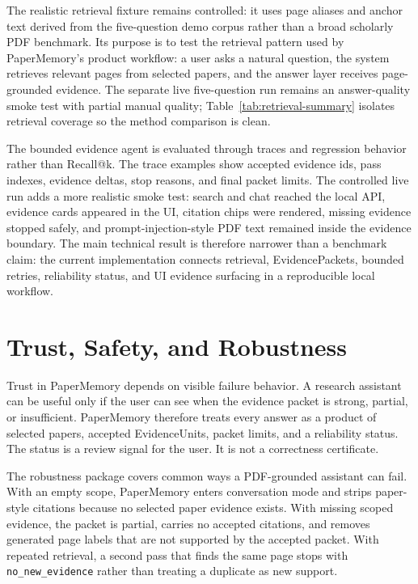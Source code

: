 \documentclass{article}
\begin{document}
The realistic retrieval fixture remains controlled: it uses page aliases and anchor text derived from the five-question demo corpus rather than a broad scholarly PDF benchmark. Its purpose is to test the retrieval pattern used by PaperMemory's product workflow: a user asks a natural question, the system retrieves relevant pages from selected papers, and the answer layer receives page-grounded evidence. The separate live five-question run remains an answer-quality smoke test with partial manual quality; Table~\ref{tab:retrieval-summary} isolates retrieval coverage so the method comparison is clean.

The bounded evidence agent is evaluated through traces and regression behavior rather than Recall@k. The trace examples show accepted evidence ids, pass indexes, evidence deltas, stop reasons, and final packet limits. The controlled live run adds a more realistic smoke test: search and chat reached the local API, evidence cards appeared in the UI, citation chips were rendered, missing evidence stopped safely, and prompt-injection-style PDF text remained inside the evidence boundary. The main technical result is therefore narrower than a benchmark claim: the current implementation connects retrieval, EvidencePackets, bounded retries, reliability status, and UI evidence surfacing in a reproducible local workflow.

\section{Trust, Safety, and Robustness}
\label{sec:trust-robustness}

Trust in PaperMemory depends on visible failure behavior. A research assistant can be useful only if the user can see when the evidence packet is strong, partial, or insufficient. PaperMemory therefore treats every answer as a product of selected papers, accepted EvidenceUnits, packet limits, and a reliability status. The status is a review signal for the user. It is not a correctness certificate.



The robustness package covers common ways a PDF-grounded assistant can fail. With an empty scope, PaperMemory enters conversation mode and strips paper-style citations because no selected paper evidence exists. With missing scoped evidence, the packet is partial, carries no accepted citations, and removes generated page labels that are not supported by the accepted packet. With repeated retrieval, a second pass that finds the same page stops with \texttt{no\_new\_evidence} rather than treating a duplicate as new support.
\end{document}
